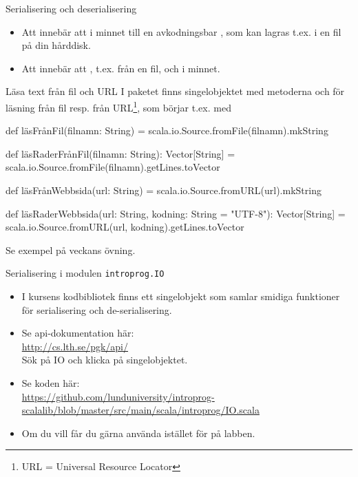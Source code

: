 


\begin{Slide}{Serialisering och deserialisering}
\begin{itemize}
  \item Att  innebär att  i minnet till en avkodningsbar , som kan lagras t.ex. i en fil på din hårddisk.
  \item Att  innebär att , t.ex. från en fil, och  i minnet.
\end{itemize}
\end{Slide}


\begin{Slide}{Läsa text från fil och URL}
I paketet  finns singelobjektet  med metoderna  och  för läsning från fil resp. från  URL\footnote{URL = Universal Resource Locator}, som börjar t.ex. med 
\begin{Code}
def läsFrånFil(filnamn: String) = scala.io.Source.fromFile(filnamn).mkString

def läsRaderFrånFil(filnamn: String): Vector[String] =
  scala.io.Source.fromFile(filnamn).getLines.toVector

def läsFrånWebbsida(url: String) = scala.io.Source.fromURL(url).mkString

def läsRaderWebbsida(url: String, kodning: String = "UTF-8"): Vector[String] =
  scala.io.Source.fromURL(url, kodning).getLines.toVector

\end{Code}
Se exempel på veckans övning.
\end{Slide}


\begin{Slide}{Serialisering i modulen \texttt{introprog.IO}}
  \begin{itemize}
    \item I kursens kodbibliotek  finns ett singelobjekt  som samlar smidiga funktioner för serialisering och de-serialisering. 
    \item Se api-dokumentation här: \\ \url{http://cs.lth.se/pgk/api/} \\ Sök på IO och klicka på singelobjektet.
    \item Se koden här:\\
    \url{https://github.com/lunduniversity/introprog-scalalib/blob/master/src/main/scala/introprog/IO.scala}
    \item Om du vill får du gärna använda  istället för  på labben.  
  \end{itemize}
\end{Slide}
